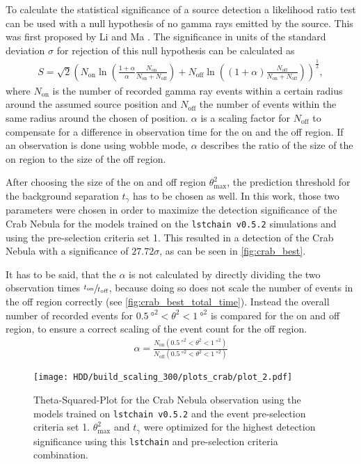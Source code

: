 To calculate the statistical significance of a source detection a likelihood ratio test can be used with a null hypothesis of no gamma rays emitted by the source.
This was first proposed by Li and Ma \cite{Li_Ma}.
The significance in units of the standard deviation $\sigma$ for rejection of this null hypothesis can be calculated as
\begin{align}
    S = \sqrt{2} \left( 
        N_\text{on} \ln\left( \frac{1 + \alpha}{\alpha} \frac{N_\text{on}}{N_\text{on} + N_\text{off}} \right) + 
        N_\text{off} \ln\left( (1 + \alpha) \frac{N_\text{off}}{N_\text{on} + N_\text{off}} \right) 
    \right)^{\frac{1}{2}},
\end{align}
where $N_\text{on}$ is the number of recorded gamma ray events within a certain radius around the assumed source position and $N_\text{off}$ the number of events within 
the same radius around the chosen of position. 
$\alpha$ is a scaling factor for $N_\text{off}$ to compensate for a difference in observation time for the on and the off region.
If an observation is done using wobble mode, $\alpha$ describes the ratio of the size of the on region to the size of the off region.

After choosing the size of the on and off region $\theta_\text{max}^2$, the prediction threshold for the background separation $t_\gamma$ has to be chosen as well.
In this work, those two parameters were chosen in order to maximize the detection significance of the Crab Nebula for the models trained on the 
\texttt{lstchain v0.5.2} simulations and using the pre-selection criteria set 1.
This resulted in a detection of the Crab Nebula with a significance of $\num{27.72} \sigma$, as can be seen in \autoref{fig:crab_best}.

It has to be said, that the $\alpha$ is not calculated by directly dividing the two observation times $\sfrac{t_\text{on}}{t_\text{off}}$, because doing so 
does not scale the number of events in the off region correctly (see \autoref{fig:crab_best_total_time}).
Instead the overall number of recorded events for $\SI{0.5}{\degree\squared} < \theta^2 < \SI{1}{\degree\squared}$ is compared for the on and off region,
to ensure a correct scaling of the event count for the off region.
\begin{align}
    \alpha = \frac{N_\text{on}(\SI{0.5}{\degree\squared} < \theta^2 < \SI{1}{\degree\squared})}{N_\text{off}(\SI{0.5}{\degree\squared} < \theta^2 < \SI{1}{\degree\squared})}
\end{align}
\begin{figure}
    \centering
    \texttt{[image: HDD/build\_scaling\_300/plots\_crab/plot\_2.pdf]}
    \caption{Theta-Squared-Plot for the Crab Nebula observation using the models trained on \texttt{lstchain v0.5.2} and the event pre-selection criteria set 1.
        $\theta_\text{max}^2$ and $t_\gamma$ were optimized for the highest detection significance using this \texttt{lstchain} and pre-selection criteria combination.
    }
    \label{fig:crab_best}
\end{figure}




